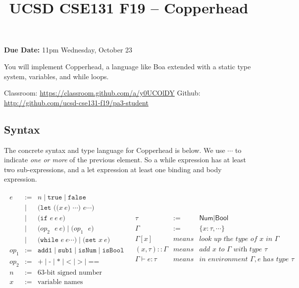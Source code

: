 \documentclass[10pt, oneside]{article}
\title{UCSD CSE131 F19 -- Copperhead}
\begin{document}
\maketitle 

{\bf Due Date:} 11pm Wednesday, October 23

You will implement Copperhead, a language like Boa extended with a static type
system, variables, and while loops.

Classroom: \url{https://classroom.github.com/a/y0UCOlDY} \hspace{2em} Github: \url{http://github.com/ucsd-cse131-f19/pa3-student}


\subsection*{Syntax}

The concrete syntax and type language for Copperhead is below. We use $\cdots$ to
indicate \textit{one or more} of the previous element. So a while expression has at
least two sub-expressions, and a let expression at least one binding and body
expression.

\[
\begin{array}{ll}
\begin{array}{lrl}
e & := & n \mid \texttt{true} \mid \texttt{false} \\
  & \mid  & \texttt{(let (($x\ e$) $\cdots$) $e \cdots$)} \\
  & \mid  & \texttt{(if $e\ e \ e$)} \\
  & \mid  & \texttt{($op_2$ $e\ e$)} \mid \texttt{($op_1$ $e$)} \\
  & \mid  & \texttt{(while $e\ e \cdots$)} \mid \texttt{(set $x\ e$)} \\
op_1 & := & \texttt{add1} \mid \texttt{sub1} \mid \texttt{isNum} \mid \texttt{isBool} \\
op_2 & := & \texttt{+} \mid \texttt{-} \mid \texttt{*} \mid \texttt{<} \mid \texttt{>} \mid \texttt{==} \\
n & := & \textrm{63-bit signed number literals} \\
x & := & \textrm{variable names} \\
\end{array}
&
\begin{array}{lrl}
\tau & := & \textsf{Num} \mid \textsf{Bool} \\
\Gamma & := & \{x:\tau,\cdots\} \\
\Gamma[x] & \textit{means} & \textit{look up the type of } x \textit{ in } \Gamma \\
(x,\tau)::\Gamma & \textit{means} & \textit{add } x \textit{ to } \Gamma \textit{ with type } \tau \\
\Gamma \vdash e : \tau & \textit{means} & \textit{in environment } \Gamma, e \textit{ has type } \tau \\
\end{array}
\end{array}
\]
\end{document}
